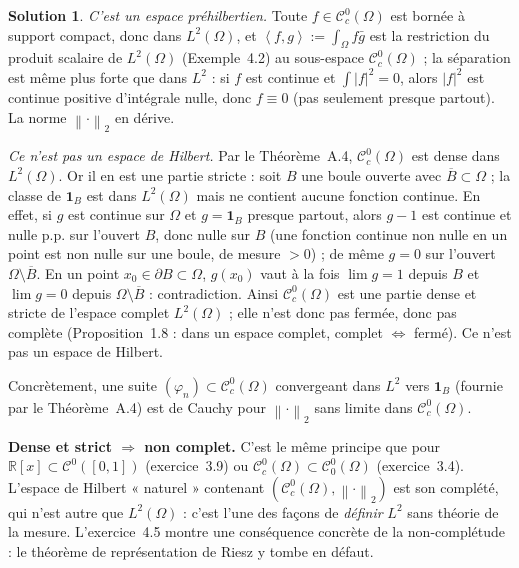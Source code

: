 \documentclass[11pt,a4paper]{article}
\newcommand{\R}{\mathbb{R}}
\newcommand{\adh}[1]{\overline{#1}}
\newcommand{\norm}[1]{\left\|#1\right\|}
\newcommand{\Cz}{\mathcal{C}^0}
\newcommand{\Cc}{\mathcal{C}^0_c}
\newcommand{\ps}[2]{\left\langle #1,#2\right\rangle}
\theoremstyle{definition}
\newtheorem*{solution}{Solution}
\begin{document}
\begin{solution}
\emph{C'est un espace préhilbertien.} Toute $f\in\Cc(\Omega)$ est bornée à support compact, donc dans $L^2(\Omega)$, et $\ps fg:=\int_\Omega f\bar g$ est la restriction du produit scalaire de $L^2(\Omega)$ (Exemple~4.2) au sous-espace $\Cc(\Omega)$ ; la séparation est même plus forte que dans $L^2$ : si $f$ est continue et $\int|f|^2=0$, alors $|f|^2$ est continue positive d'intégrale nulle, donc $f\equiv0$ (pas seulement presque partout). La norme $\norm\cdot_2$ en dérive.

\emph{Ce n'est pas un espace de Hilbert.} Par le Théorème~A.4, $\Cc(\Omega)$ est dense dans $L^2(\Omega)$. Or il en est une partie stricte : soit $B$ une boule ouverte avec $\adh B\subset\Omega$ ; la classe de $\mathbf 1_B$ est dans $L^2(\Omega)$ mais ne contient aucune fonction continue. En effet, si $g$ est continue sur $\Omega$ et $g=\mathbf 1_B$ presque partout, alors $g-1$ est continue et nulle p.p. sur l'ouvert $B$, donc nulle sur $B$ (une fonction continue non nulle en un point est non nulle sur une boule, de mesure $>0$) ; de même $g=0$ sur l'ouvert $\Omega\setminus\adh B$. En un point $x_0\in\partial B\subset\Omega$, $g(x_0)$ vaut à la fois $\lim g=1$ depuis $B$ et $\lim g=0$ depuis $\Omega\setminus\adh B$ : contradiction. Ainsi $\Cc(\Omega)$ est une partie dense et stricte de l'espace complet $L^2(\Omega)$ ; elle n'est donc pas fermée, donc pas complète (Proposition~1.8 : dans un espace complet, complet $\iff$ fermé). Ce n'est pas un espace de Hilbert.

Concrètement, une suite $(\varphi_n)\subset\Cc(\Omega)$ convergeant dans $L^2$ vers $\mathbf 1_B$ (fournie par le Théorème~A.4) est de Cauchy pour $\norm\cdot_2$ sans limite dans $\Cc(\Omega)$.
\end{solution}

\begin{pointcle}
\textbf{Dense et strict $\Rightarrow$ non complet.} C'est le même principe que pour $\R[x]\subset\Cz([0,1])$ (exercice~3.9) ou $\Cc(\Omega)\subset\Cz_0(\Omega)$ (exercice~3.4). L'espace de Hilbert « naturel » contenant $(\Cc(\Omega),\norm\cdot_2)$ est son complété, qui n'est autre que $L^2(\Omega)$ : c'est l'une des façons de \emph{définir} $L^2$ sans théorie de la mesure. L'exercice~4.5 montre une conséquence concrète de la non-complétude : le théorème de représentation de Riesz y tombe en défaut.
\end{pointcle}
\end{document}
